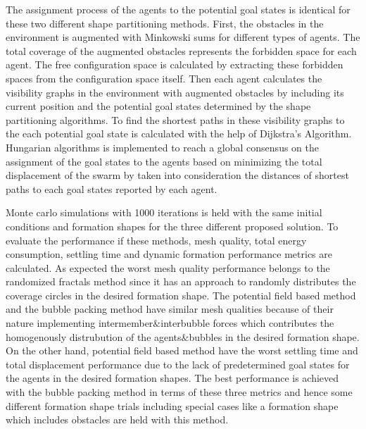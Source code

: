 The assignment process of the agents to the potential goal states is identical for these two different shape partitioning methods. First, the obstacles in the environment is augmented with Minkowski sums for different types of agents. The total coverage of the augmented obstacles represents the forbidden space for each agent. The free configuration space is calculated by extracting these forbidden spaces from the configuration space itself. Then each agent calculates the visibility graphs in the environment with augmented obstacles by including its current position and the potential goal states determined by the shape partitioning algorithms. To find the shortest paths in these visibility graphs to the each potential goal state is calculated with the help of Dijkstra's Algorithm. Hungarian algorithms is implemented to reach a global consensus on the assignment of the goal states to the agents based on minimizing the total displacement of the swarm by taken into consideration the distances of shortest paths to each goal states reported by each agent. 
       
Monte carlo simulations with 1000 iterations is held with the same initial conditions and formation shapes for the three different proposed solution. To evaluate the performance if these methods, mesh quality, total energy consumption, settling time and dynamic formation performance metrics are calculated. As expected the worst mesh quality performance belongs to the randomized fractals method since it has an approach to randomly distributes the coverage circles in the desired formation shape. The potential field based method and the bubble packing method have similar mesh qualities because of their nature implementing intermember$\&$interbubble forces which contributes the homogenously distrubution of the agents$\&$bubbles in the desired formation shape. On the other hand, potential field based method have the worst settling time and total displacement performance due to the lack of predetermined goal states for the agents in the desired formation shapes. The best performance is achieved with the bubble packing method in terms of these three metrics and hence some different formation shape trials including special cases like a formation shape which includes obstacles are held with this method. 
       
